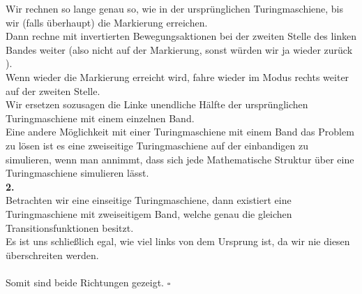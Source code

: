 \documentclass[12pt, a4paper]{article}
\newcommand*{\qed}{\null\nobreak\hfill\ensuremath{\square}}
\begin{document}
Wir rechnen so lange genau so, wie in der ursprünglichen Turingmaschiene, bis wir (falls überhaupt) die Markierung erreichen. \\
Dann rechne mit invertierten Bewegungsaktionen bei der zweiten Stelle des linken Bandes weiter (also nicht auf der Markierung, sonst würden wir ja wieder zurück ).\\
Wenn wieder die Markierung erreicht wird, fahre wieder im  Modus rechts weiter auf der zweiten Stelle. \\
Wir ersetzen sozusagen die Linke unendliche Hälfte der ursprünglichen Turingmaschiene mit einem einzelnen Band. \\
Eine andere Möglichkeit mit einer Turingmaschiene mit einem Band das Problem zu lösen ist es eine zweiseitige Turingmaschiene auf der einbandigen zu simulieren, wenn man annimmt, dass sich jede Mathematische Struktur über eine Turingmaschiene simulieren lässt.\\
\textbf{2. } \textquote{\(\Leftarrow\)} \\
Betrachten wir eine einseitige Turingmaschiene, dann existiert eine Turingmaschiene mit zweiseitigem Band, welche genau die gleichen Transitionsfunktionen besitzt. \\
Es ist uns schließlich egal, wie viel  links von dem Ursprung ist, da wir nie diesen überschreiten werden. \\
\\
Somit sind beide Richtungen gezeigt. \qed
\end{document}
